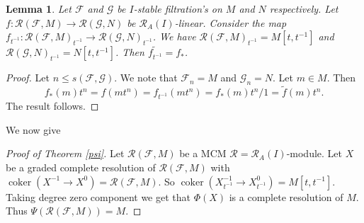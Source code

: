 \documentclass{amsart}
\newcommand{\eR}{\mathcal{R} }
\newcommand{\Fc}{\mathcal{F} }
\newcommand{\Gc}{\mathcal{G} }
\newcommand{\rt}{\rightarrow}
\newcommand{\wt}{\widetilde }
\newcommand{\coker}{\operatorname{coker}}
\theoremstyle{plain}
\newtheorem{lemma}[theorem]{Lemma}
\theoremstyle{definition}
\theoremstyle{remark}
\begin{document}
{\begin{lemma}
\label{loc-tilde}
Let $\Fc$ and $\Gc$ be $I$-stable filtration's on $M$ and $N$ respectively. Let \\ $f \colon \eR(\Fc, M) \rt \eR(\Gc, N)$ be $\eR_A(I)$-linear. Consider the map $f_{t^{-1}} \colon \eR(\Fc, M)_{t^{-1}} \rt \eR(\Gc, N)_{t^{-1}}$. We have $\eR(\Fc, M)_{t^{-1}} = M[t,t^{-1}]$ and  $\eR(\Gc, N)_{t^{-1}} = N[t,t^{-1}]$. Then $\wt{f_{t^{-1}}} = f_*$.
\end{lemma}
\begin{proof}
Let $n \leq s(\Fc, \Gc)$. We note that $\Fc_n = M$ and $\Gc_n = N$. Let $m \in M$.
Then $$f_*(m)t^n = f(mt^n) = f_{t^{-1}}(mt^{n}) = f_*(m)t^{n}/1 = \wt{f}(m)t^n.$$
The result follows.
\end{proof}
We now give
\begin{proof}[Proof of Theorem \ref{psi}]
Let $\eR(\Fc, M)$ be  a MCM $\eR = \eR_A(I)$-module. Let $X$ be a graded complete resolution of $\eR(\Fc, M)$ with  $\coker(X^{-1} \rt X^0) = \eR(\Fc, M)$. So $\coker(X^{-1}_{t^{-1}} \rt X^0_{t^{-1}}) = M[t, t^{-1}]$. Taking degree zero component we get that $\Phi(X)$ is a complete resolution of $M$. Thus $\Psi(\eR(\Fc, M)) = M$.


\end{proof}}
\end{document}
